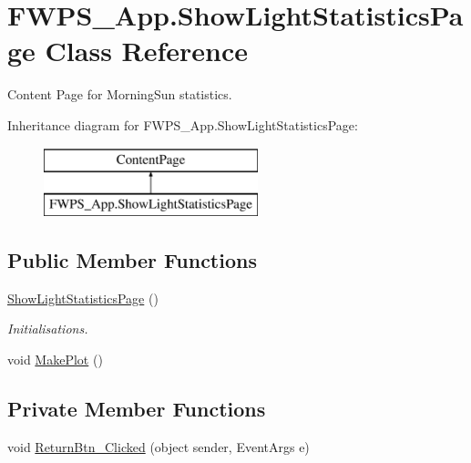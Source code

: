 \hypertarget{class_f_w_p_s___app_1_1_show_light_statistics_page}{}\section{F\+W\+P\+S\+\_\+\+App.\+Show\+Light\+Statistics\+Page Class Reference}
\label{class_f_w_p_s___app_1_1_show_light_statistics_page}


Content Page for Morning\+Sun statistics.  


Inheritance diagram for F\+W\+P\+S\+\_\+\+App.\+Show\+Light\+Statistics\+Page\+:\begin{figure}[H]
\begin{center}
\leavevmode
\includegraphics[height=2.000000cm]{class_f_w_p_s___app_1_1_show_light_statistics_page}
\end{center}
\end{figure}
\subsection*{Public Member Functions}
\begin{DoxyCompactItemize}
\item 
\mbox{\hyperlink{class_f_w_p_s___app_1_1_show_light_statistics_page_a407f3e39883e642353b0b1b331e19f2a}{Show\+Light\+Statistics\+Page}} ()
\begin{DoxyCompactList}\small\item\em Initialisations. \end{DoxyCompactList}\item 
void \mbox{\hyperlink{class_f_w_p_s___app_1_1_show_light_statistics_page_a9948602267d8e84fb0ea662df14bff29}{Make\+Plot}} ()
\end{DoxyCompactItemize}
\subsection*{Private Member Functions}
\begin{DoxyCompactItemize}
\item 
void \mbox{\hyperlink{class_f_w_p_s___app_1_1_show_light_statistics_page_acac747b108b4e06beee029b036b38195}{Return\+Btn\+\_\+\+Clicked}} (object sender, Event\+Args e)
\end{DoxyCompactItemize}



